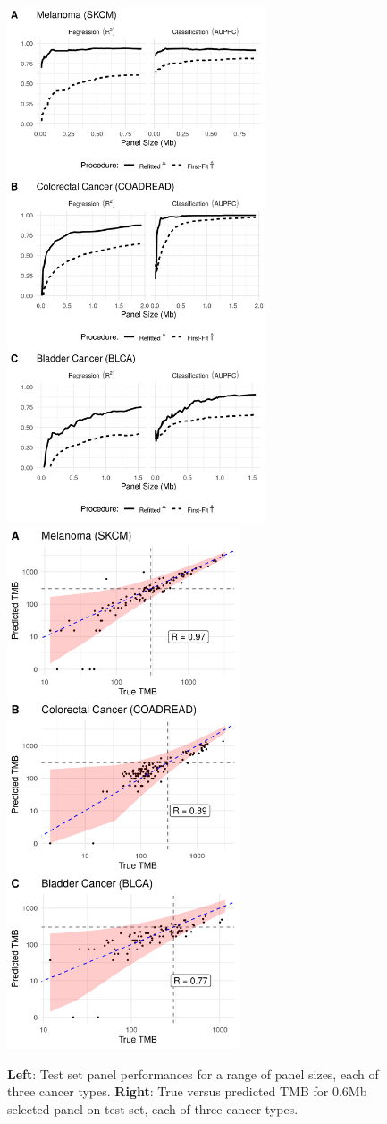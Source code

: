 \documentclass[12pt]{article}
\begin{document}
\begin{figure}[h]
    \centering
    \includegraphics[width=3in]{results/figures/joint_version_fig6.png} \hspace{5pt}
    \includegraphics[width=2.7in]{results/figures/joint_version_fig8.png}
    \caption{\textbf{Left}: Test set panel performances for a range of panel sizes, each of three cancer types. \textbf{Right}: True versus predicted TMB for 0.6Mb selected panel on test set, each of three cancer types.
    \label{fig:joint_versions_figs68}}
\end{figure}
\newpage
\end{document}
